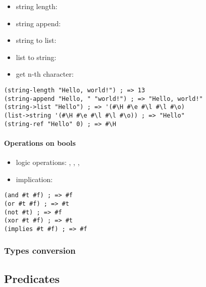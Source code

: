 \documentclass[a4paper,landscape,10pt]{article}
\begin{document}
\begin{multicols*}{2}
  \begin{itemize}
    \item string length: 
    \item string append: 
    \item string to list: 
    \item list to string: 
    \item get n-th character: 
  \end{itemize}

  \begin{lstlisting}[language=Racket]
(string-length "Hello, world!") ; => 13
(string-append "Hello, " "world!") ; => "Hello, world!"
(string->list "Hello") ; => '(#\H #\e #\l #\l #\o)
(list->string '(#\H #\e #\l #\l #\o)) ; => "Hello"
(string-ref "Hello" 0) ; => #\H
\end{lstlisting}

  \paragraph{Operations on bools}

  \begin{itemize}
    \item logic operations: , , , 
    \item implication: 
  \end{itemize}

  \begin{lstlisting}[language=Racket]
(and #t #f) ; => #f
(or #t #f) ; => #t
(not #t) ; => #f
(xor #t #f) ; => #t
(implies #t #f) ; => #f
\end{lstlisting}

  \subsubsection{Types conversion}

  \missing

  \subsection{Predicates}


\end{multicols*}
\end{document}
